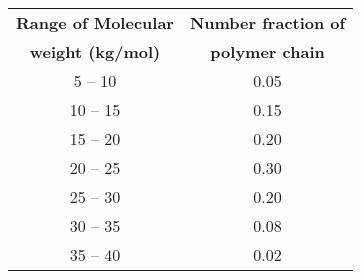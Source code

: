 \begin{center}
\begin{tabular}{|c|c|}
\hline
\textbf{Range of Molecular} & \textbf{Number fraction of} \\
\textbf{weight (kg/mol)} & \textbf{polymer chain} \\
\hline
5 -- 10 & 0.05 \\
\hline
10 -- 15 & 0.15 \\
\hline
15 -- 20 & 0.20 \\
\hline
20 -- 25 & 0.30 \\
\hline
25 -- 30 & 0.20 \\
\hline
30 -- 35 & 0.08 \\
\hline
35 -- 40 & 0.02 \\
\hline
\end{tabular}
\end{center}